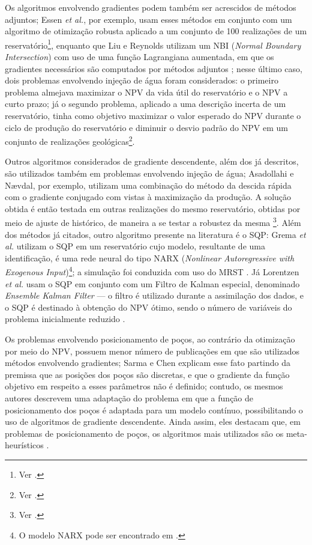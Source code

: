 Os algoritmos envolvendo gradientes podem também ser acrescidos de métodos adjuntos; Essen \textit{et al.}, por exemplo, usam esses métodos em conjunto com um algoritmo de otimização robusta aplicado a um conjunto de 100 realizações de um reservatório\footnote{Ver \cite{SPE:RWO}.}, enquanto que Liu e Reynolds utilizam um NBI (\textit{Normal Boundary Intersection}) com uso de uma função Lagrangiana aumentada, em que os gradientes necessários são computados por métodos adjuntos \cite{GEO:LIU}; nesse último caso, dois problemas envolvendo injeção de água foram considerados: o primeiro problema almejava maximizar o NPV da vida útil do reservatório e o NPV a curto prazo; já o segundo problema, aplicado a uma descrição incerta de um reservatório, tinha como objetivo maximizar o valor esperado do NPV durante o ciclo de produção do reservatório e diminuir o desvio padrão do NPV em um conjunto de realizações geológicas\footnote{Ver \cite{GEO:LIU}.}.

Outros algoritmos considerados de gradiente descendente, além dos já descritos, são utilizados também em problemas envolvendo injeção de água; Asadollahi e N{\ae}vdal, por exemplo, utilizam uma combinação do método da descida rápida com o gradiente conjugado com vistas à maximização da produção. A solução obtida é então testada em outras realizações do mesmo reservatório, obtidas por meio de ajuste de histórico, de maneira a se testar a robustez da mesma \footnote{Ver \cite{SPE:WFO}.}. Além dos métodos já citados, outro algoritmo presente na literatura é o SQP: Grema \textit{et al.} utilizam o SQP em um reservatório cujo modelo, resultante de uma identificação, é uma rede neural do tipo NARX (\textit{Nonlinear Autoregressive with Exogenous Input})\footnote{O modelo NARX pode ser encontrado em \cite[p. 390]{aguirre}.}; a simulação foi conduzida com uso do MRST \cite{grema2017optimization}. Já Lorentzen \textit{et al.} usam o SQP em conjunto com um Filtro de Kalman especial, denominado \textit{Ensemble Kalman Filter} --- o filtro é utilizado durante a assimilação dos dados, e o SQP é destinado à obtenção do NPV ótimo, sendo o número de variáveis do problema inicialmente reduzido \cite{lorentzen2009sqp}.

Os problemas envolvendo posicionamento de poços, ao contrário da otimização por meio do NPV, possuem menor número de publicações em que são utilizados métodos envolvendo gradientes; Sarma e Chen explicam esse fato partindo da premissa que as posições dos poços são discretas, e que o gradiente da função objetivo em respeito a esses parâmetros não é definido; contudo, os mesmos autores descrevem uma adaptação do problema em que a função de posicionamento dos poços é adaptada para um modelo contínuo, possibilitando o uso de algoritmos de gradiente descendente. Ainda assim, eles destacam que, em problemas de posicionamento de poços, os algoritmos mais utilizados são os meta-heurísticos \cite{sarmaChen}.


